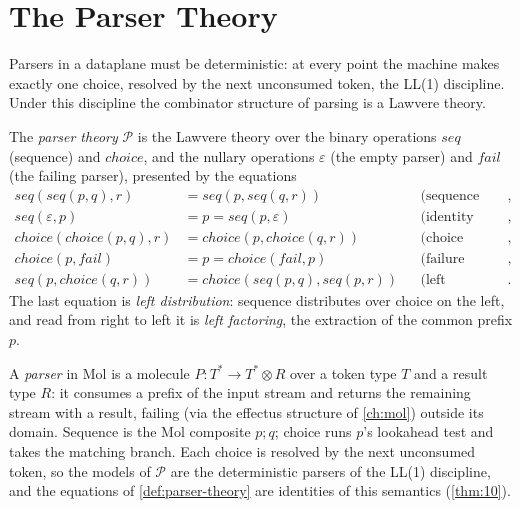 \section{The Parser Theory}\label{sec:lawvere-parser}

Parsers in a dataplane must be deterministic: at every point the machine
makes exactly one choice, resolved by the next unconsumed token, the LL(1)
discipline. Under this discipline the combinator structure of parsing is a
Lawvere theory.

\begin{definition}
\label{def:parser-theory}
The \emph{parser theory} $\mathcal{P}$ is the Lawvere theory over the
binary operations $\mathit{seq}$ (sequence) and $\mathit{choice}$, and the
nullary operations $\varepsilon$ (the empty parser) and $\mathit{fail}$
(the failing parser), presented by the equations
\begin{align}
\mathit{seq} (\mathit{seq} (p,q),r) &= \mathit{seq} (p,\mathit{seq} (q,r))
&&\text{(sequence associative)},\\
\mathit{seq} (\varepsilon,p) &= p = \mathit{seq} (p,\varepsilon)
&&\text{(identity laws)},\\
\mathit{choice} (\mathit{choice} (p,q),r) &= \mathit{choice} (p,\mathit{choice} (q,r))
&&\text{(choice associative)},\\
\mathit{choice} (p,\mathit{fail}) &= p = \mathit{choice} (\mathit{fail},p)
&&\text{(failure identity)},\\
\mathit{seq} (p,\mathit{choice} (q,r)) &= \mathit{choice} (\mathit{seq} (p,q),\mathit{seq} (p,r))
&&\text{(left distribution)}.
\end{align}
The last equation is \emph{left distribution}: sequence distributes over
choice on the left, and read from right to left it is \emph{left
factoring}, the extraction of the common prefix $p$.
\end{definition}

A \emph{parser} in Mol is a molecule $P : T^{*} \to T^{*} \otimes R$ over
a token type $T$ and a result type $R$: it consumes a prefix of the input
stream and returns the remaining stream with a result, failing (via the
effectus structure of \autoref{ch:mol}) outside its domain. Sequence is the
Mol composite $p;q$; choice runs $p$'s lookahead test and takes the
matching branch. Each choice is resolved by the next unconsumed token, so
the models of $\mathcal{P}$ are the deterministic parsers of the LL(1)
discipline, and the equations of \autoref{def:parser-theory} are identities
of this semantics (\autoref{thm:10}).

